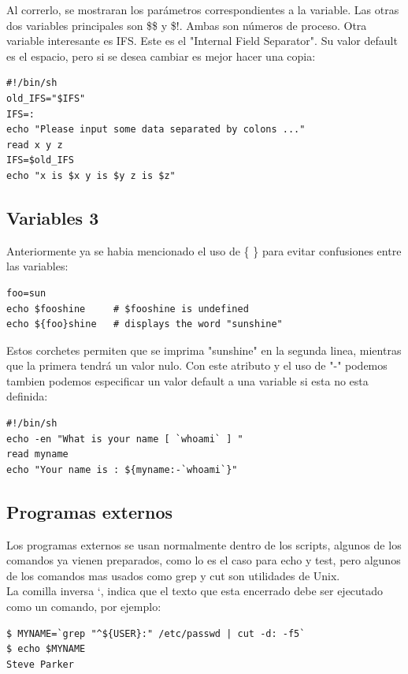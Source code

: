 \documentclass[12pt]{article}
\begin{document}
Al correrlo, se mostraran los parámetros correspondientes a la variable. Las otras dos variables principales son \$\$ y \$!. Ambas son números de proceso. Otra variable interesante es IFS. Este es el "Internal Field Separator". Su valor default es el espacio, pero si se desea cambiar es mejor hacer una copia:

\begin{verbatim}
#!/bin/sh
old_IFS="$IFS"
IFS=:
echo "Please input some data separated by colons ..."
read x y z
IFS=$old_IFS
echo "x is $x y is $y z is $z"
\end{verbatim}

\subsection{Variables 3}
Anteriormente ya se habia mencionado el uso de \{ \} para evitar confusiones entre las variables:

\begin{verbatim}
foo=sun
echo $fooshine     # $fooshine is undefined
echo ${foo}shine   # displays the word "sunshine"
\end{verbatim}

Estos corchetes permiten que se imprima "sunshine" en la segunda linea, mientras que la primera tendrá un valor nulo. Con este atributo y el uso de "-" podemos tambien podemos especificar un valor default a una variable si esta no esta definida:

\begin{verbatim}
#!/bin/sh
echo -en "What is your name [ `whoami` ] "
read myname
echo "Your name is : ${myname:-`whoami`}"
\end{verbatim}

\subsection{Programas externos}
Los programas externos se usan normalmente dentro de los scripts, algunos de los comandos ya vienen preparados, como lo es el caso para echo y test, pero algunos de los comandos mas usados como grep y cut son utilidades de Unix. \\ 

La comilla inversa `, indica que el texto que esta encerrado debe ser ejecutado como un comando, por ejemplo:

\begin{verbatim}
$ MYNAME=`grep "^${USER}:" /etc/passwd | cut -d: -f5`
$ echo $MYNAME
Steve Parker
\end{verbatim}
\end{document}

